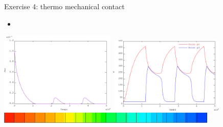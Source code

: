 \begin{frame}{
                 {Exercise 4: thermo mechanical contact}}
             {}
  \begin{itemize}
    \item {}
  \end{itemize}
  \begin{center}
    \includegraphics[width=5.5cm]{images/exo/exo_4_solu_bis_evol_jeu}
    \includegraphics[width=5.5cm]{images/exo/exo_4_solu_bis_evol_t}\\
    \vspace{0.5cm}
    \if {}
    \else
      \includegraphics[width=10.5cm]{images/exo/exo_4_solu_bis_temperature.101}
    \fi
  \end{center}
\end{frame}
